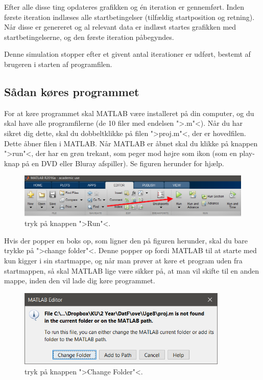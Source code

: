 \documentclass[a4paper,10pt]{article} 	%
\numberwithin{equation}{section}
\begin{document}
	Efter alle disse ting opdateres grafikken og én iteration er gennemført. Inden første iteration indlæses alle startbetingelser (tilfældig startposition og retning). Når disse er genereret og al relevant data er indlæst startes grafikken med startbetingelserne, og den første iteration påbegyndes.
	
	Denne simulation stopper efter et givent antal iterationer er udført, bestemt af brugeren i starten af programfilen.
	
	\subsection{Sådan køres programmet}
	For at køre programmet skal MATLAB være installeret på din computer, og du skal have alle programfilerne (de 10 filer med endelsen ">.m"<). Når du har sikret dig dette, skal du dobbeltklikke på filen ">proj.m"<, der er hovedfilen. Dette åbner filen i MATLAB. Når MATLAB er åbnet skal du klikke på knappen ">run"<, der har en grøn trekant, som peger mod højre som ikon (som en play-knap på en DVD eller Bluray afspiller). Se figuren herunder for hjælp.
	\begin{figure}[H]
		\centering
		\includegraphics[width=\textwidth]{img/run.png}
		\caption{tryk på knappen ">Run"<.}
		\label{fig:run}
	\end{figure}
	
	Hvis der popper en boks op, som ligner den på figuren herunder, skal du bare trykke på ">change folder"<. Denne popper op fordi MATLAB til at starte med kun kigger i sin startmappe, og når man prøver at køre et program uden fra startmappen, så skal MATLAB lige være sikker på, at man vil skifte til en anden mappe, inden den vil lade dig køre programmet.
	\begin{figure}[H]
		\centering
		\includegraphics[width=10cm]{img/folder.png}
		\caption{tryk på knappen ">Change Folder"<.}
		\label{fig:folder}
	\end{figure}
	
\end{document}
